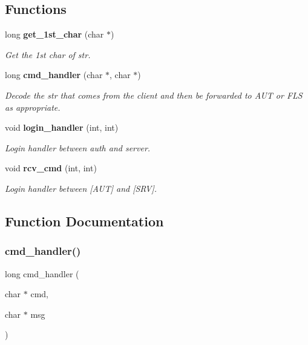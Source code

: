 \subsection*{Functions}
\begin{DoxyCompactItemize}
\item 
long \textbf{ get\+\_\+1st\+\_\+char} (char $\ast$)
\begin{DoxyCompactList}\small\item\em Get the 1st char of str. \end{DoxyCompactList}\item 
long \textbf{ cmd\+\_\+handler} (char $\ast$, char $\ast$)
\begin{DoxyCompactList}\small\item\em Decode the str that comes from the client and then be forwarded to A\+UT or F\+LS as appropriate. \end{DoxyCompactList}\item 
void \textbf{ login\+\_\+handler} (int, int)
\begin{DoxyCompactList}\small\item\em Login handler between auth and server. \end{DoxyCompactList}\item 
void \textbf{ rcv\+\_\+cmd} (int, int)
\begin{DoxyCompactList}\small\item\em Login handler between [A\+UT] and [S\+RV]. \end{DoxyCompactList}\end{DoxyCompactItemize}


\subsection{Function Documentation}
\mbox{\label{server_8h_a4199c4fe35b146a5a21818e16572ce17}} 
\subsubsection{cmd\+\_\+handler()}
{\footnotesize\ttfamily long cmd\+\_\+handler (\begin{DoxyParamCaption}\item[{char $\ast$}]{cmd,  }\item[{char $\ast$}]{msg }\end{DoxyParamCaption})}



